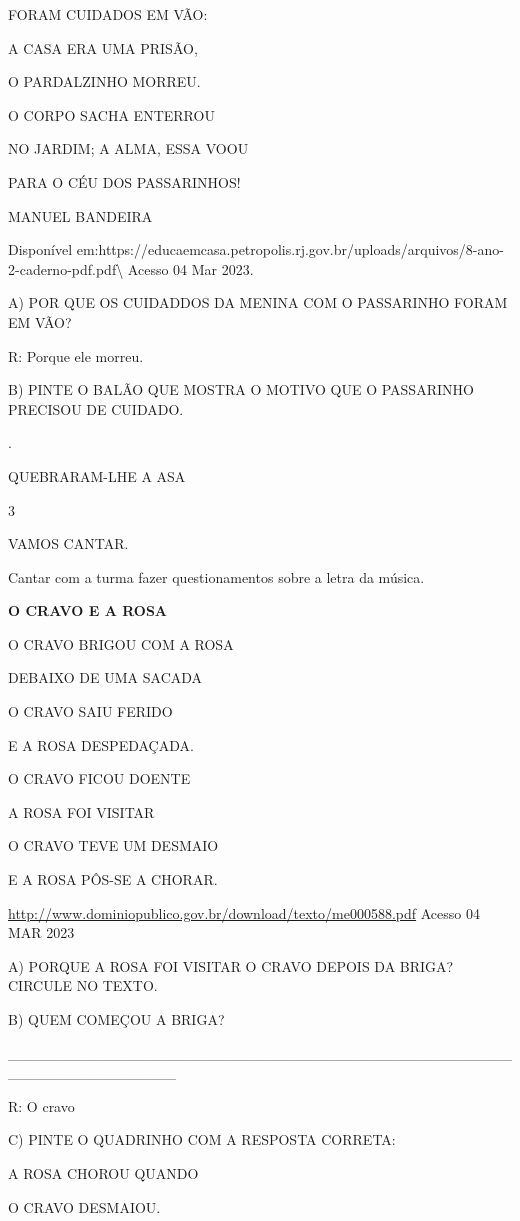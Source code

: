 {{FORAM CUIDADOS EM VÃO:

A CASA ERA UMA PRISÃO,

O PARDALZINHO MORREU.

O CORPO SACHA ENTERROU

NO JARDIM; A ALMA, ESSA \protect\hypertarget{_Hlk128858343}{}{}VOOU

PARA O CÉU DOS PASSARINHOS!

MANUEL BANDEIRA

Disponível
em:https://educaemcasa.petropolis.rj.gov.br/uploads/arquivos/8-ano-2-caderno-pdf.pdf\textbackslash{}
Acesso 04 Mar 2023.

A) POR QUE OS CUIDADDOS DA MENINA COM O PASSARINHO FORAM EM VÃO?

R: Porque ele morreu.

B) PINTE O BALÃO QUE MOSTRA O MOTIVO QUE O PASSARINHO PRECISOU DE
CUIDADO.

.

QUEBRARAM-LHE A ASA

\num{3}

VAMOS CANTAR.

Cantar com a turma fazer questionamentos sobre a letra da música.

\textbf{O CRAVO E A ROSA}

O CRAVO BRIGOU COM A ROSA

DEBAIXO DE UMA SACADA

O CRAVO SAIU FERIDO

E A ROSA DESPEDAÇADA.

\protect\hypertarget{_Hlk128859393}{}{}O CRAVO FICOU DOENTE

A ROSA FOI VISITAR

O CRAVO TEVE UM DESMAIO

E A ROSA PÔS-SE A CHORAR.

\url{http://www.dominiopublico.gov.br/download/texto/me000588.pdf}
Acesso 04 MAR 2023

A) PORQUE A ROSA FOI VISITAR O CRAVO DEPOIS DA BRIGA? CIRCULE NO TEXTO.

B) QUEM COMEÇOU A BRIGA?

\_\_\_\_\_\_\_\_\_\_\_\_\_\_\_\_\_\_\_\_\_\_\_\_\_\_\_\_\_\_\_\_\_\_\_\_\_\_\_\_\_\_\_\_\_\_\_\_\_\_\_\_\_\_\_\_\_\_\_\_\_\_\_\_

R: O cravo

C) PINTE O QUADRINHO COM A RESPOSTA CORRETA:

A ROSA CHOROU QUANDO

O CRAVO DESMAIOU.

}}
